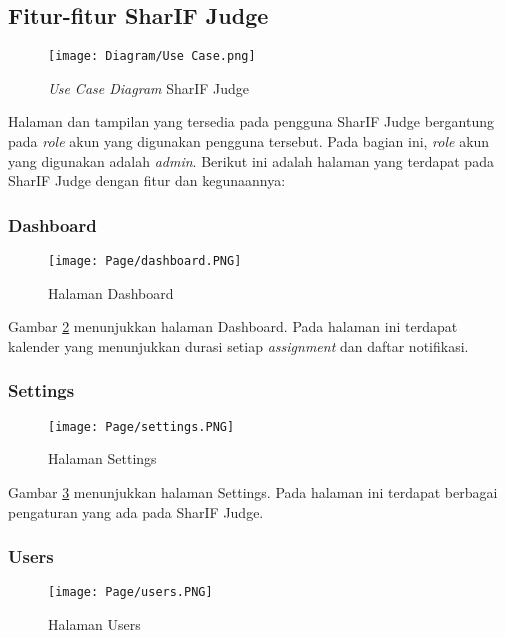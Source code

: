 \subsection{Fitur-fitur SharIF Judge}
\label{subs:3:fitur}

    \begin{figure}[H]
    	\centering  
    	\texttt{[image: Diagram/Use Case.png]}  
    	\caption{\textit{Use Case Diagram} SharIF Judge}
    	\label{fig:3:usecased} 
    \end{figure} 

Halaman dan tampilan yang tersedia pada pengguna SharIF Judge bergantung pada \textit{role} akun yang digunakan pengguna tersebut. Pada bagian ini, \textit{role} akun yang digunakan adalah \textit{admin}. Berikut ini adalah halaman yang terdapat pada SharIF Judge dengan fitur dan kegunaannya:

\subsubsection{Dashboard}
    \begin{figure}[H]
    	\centering  
    	\texttt{[image: Page/dashboard.PNG]}  
    	\caption{Halaman Dashboard}
    	\label{fig:3:dashboard} 
    \end{figure} 
    
    Gambar \ref{fig:3:dashboard} menunjukkan halaman Dashboard. Pada halaman ini terdapat kalender yang menunjukkan durasi setiap \textit{assignment} dan daftar notifikasi.
    
\subsubsection{Settings}
    \begin{figure}[H]
    	\centering  
    	\texttt{[image: Page/settings.PNG]}  
    	\caption{Halaman Settings}
    	\label{fig:3:settings} 
    \end{figure} 
    
    Gambar \ref{fig:3:settings} menunjukkan halaman Settings. Pada halaman ini terdapat berbagai pengaturan yang ada pada SharIF Judge.
    
\subsubsection{Users}
    \begin{figure}[H]
    	\centering  
    	\texttt{[image: Page/users.PNG]}  
    	\caption{Halaman Users}
    	\label{fig:3:users} 
    \end{figure} 
    
